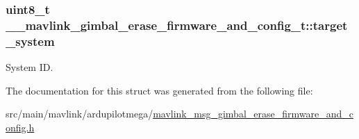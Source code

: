 \hypertarget{struct____mavlink__gimbal__erase__firmware__and__config__t_a57f32582e95e3bfff3c32a4fe4b54887}{
\subsubsection[{target\+\_\+system}]{\setlength{\rightskip}{0pt plus 5cm}uint8\+\_\+t \+\_\+\+\_\+mavlink\+\_\+gimbal\+\_\+erase\+\_\+firmware\+\_\+and\+\_\+config\+\_\+t\+::target\+\_\+system}}\label{struct____mavlink__gimbal__erase__firmware__and__config__t_a57f32582e95e3bfff3c32a4fe4b54887}


System I\+D. 



The documentation for this struct was generated from the following file\+:\begin{DoxyCompactItemize}
\item 
src/main/mavlink/ardupilotmega/\hyperlink{mavlink__msg__gimbal__erase__firmware__and__config_8h}{mavlink\+\_\+msg\+\_\+gimbal\+\_\+erase\+\_\+firmware\+\_\+and\+\_\+config.\+h}\end{DoxyCompactItemize}

